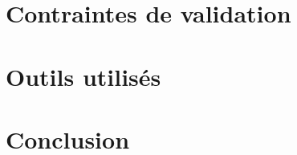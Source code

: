 \part{Contraintes de validation }
\setcounter{section}{0}

\part{Outils utilisés}
\setcounter{section}{0}

\part{Conclusion}
\setcounter{section}{0}



